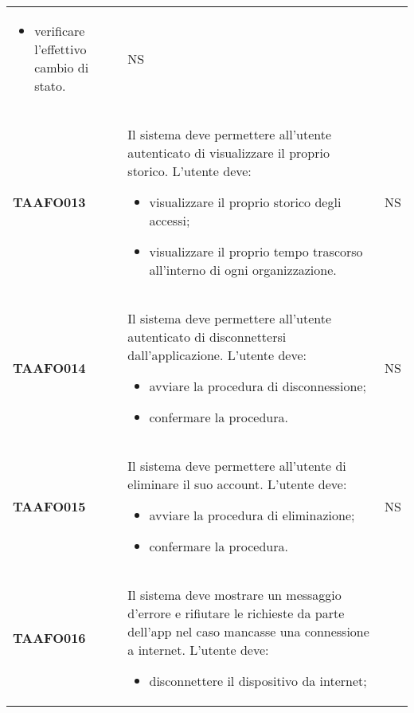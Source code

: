 \documentclass[../piano-di-qualifica.tex]{subfiles}
\begin{document}
\begin{centering}
\begin{longtable}[H]{>{\centering\bfseries}m{3cm} >{}p{10cm} >{\centering\arraybackslash}m{3cm}}
\begin{itemize}
                        \item verificare l'effettivo cambio di stato.
                      \end{itemize}
                      & NS \\
        TAAFO013      & Il sistema deve permettere all'utente autenticato di visualizzare il proprio storico. \newline
                      L'utente deve:
                      \begin{itemize}
                        \item visualizzare il proprio storico degli accessi;
                        \item visualizzare il proprio tempo trascorso all'interno di ogni organizzazione.
                      \end{itemize}
                      & NS \\
        TAAFO014      & Il sistema deve permettere all'utente autenticato di disconnettersi dall'applicazione. \newline
                      L'utente deve:
                      \begin{itemize}
                        \item avviare la procedura di disconnessione;
                        \item confermare la procedura.
                      \end{itemize}
                      & NS \\
        TAAFO015      & Il sistema deve permettere all'utente di eliminare il suo account. \newline
                      L'utente deve:
                      \begin{itemize}
                        \item avviare la procedura di eliminazione;
                        \item confermare la procedura.
                      \end{itemize}
                      & NS \\
        TAAFO016      & Il sistema deve mostrare un messaggio d'errore e rifiutare le richieste da parte dell'app nel caso mancasse una connessione a internet. \newline
                      L'utente deve:
                      \begin{itemize}
                        \item disconnettere il dispositivo da internet;

\end{itemize}
\end{longtable}
\end{centering}
\end{document}

